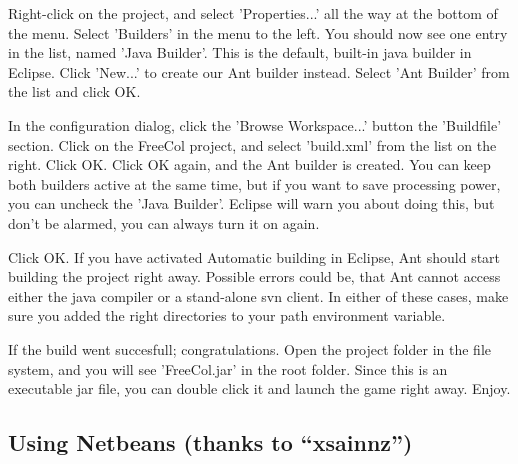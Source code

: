 \documentclass[12pt]{book}
\begin{document}
Right-click on the project, and select 'Properties...' all the way at
the bottom of the menu. Select 'Builders' in the menu to the left. You
should now see one entry in the list, named 'Java Builder'. This is
the default, built-in java builder in Eclipse. Click 'New...' to
create our Ant builder instead. Select 'Ant Builder' from the list and
click OK.

In the configuration dialog, click the 'Browse Workspace...' button
the 'Buildfile' section. Click on the FreeCol project, and select
'build.xml' from the list on the right. Click OK. Click OK again, and
the Ant builder is created. You can keep both builders active at the
same time, but if you want to save processing power, you can uncheck
the 'Java Builder'. Eclipse will warn you about doing this, but don't
be alarmed, you can always turn it on again.

Click OK. If you have activated Automatic building in Eclipse, Ant
should start building the project right away. Possible errors could
be, that Ant cannot access either the java compiler or a stand-alone
svn client. In either of these cases, make sure you added the right
directories to your path environment variable.

If the build went succesfull; congratulations. Open the project folder
in the file system, and you will see 'FreeCol.jar' in the root
folder. Since this is an executable jar file, you can double click it
and launch the game right away. Enjoy.


\hypertarget{Using Netbeans}{\subsection{Using Netbeans (thanks to ``xsainnz'')}}
\end{document}

